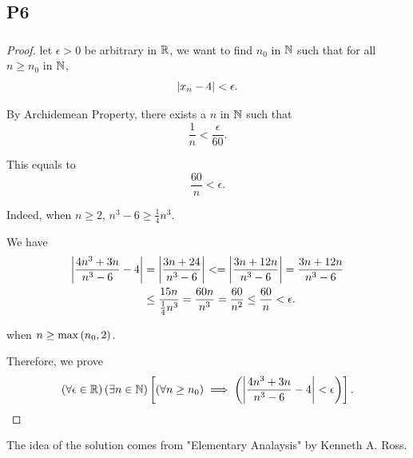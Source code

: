 
\subsection{P6}

\subsubsection{}
\begin{proof}
    let $\epsilon > 0$ be arbitrary in $\mathbb{R}$, we want to find $n_0 $ in $\mathbb{N}$ such that for all $n \geq n_0$ in $\mathbb{N}$, 
    \begin{equation*}
        \left|x_n - 4\right| < \epsilon. 
    \end{equation*} 

    By Archidemean Property, there exists a $n$ in $\mathbb{N}$ such that 
    \begin{equation*}
        \frac{1}{n} < \frac{\epsilon}{60}. 
    \end{equation*}

    This equals to 
    \begin{equation*}
        \frac{60}{n} < \epsilon. 
    \end{equation*}

    Indeed, when $n \geq 2$, $n^3 - 6 \geq \frac{1}{4}n^3$. 

    We have 
    \begin{align*}
        \left|\frac{4n^3 + 3n}{n^3 - 6} - 4\right| &= \left|\frac{
            3n + 24
        }{
            n^3 - 6
        }\right| <= 
        \left|
            \frac{
                3n + 12n
            }{n^3 - 6}
        \right| 
        =
        \frac{
            3n + 12n
        }{n^3 - 6} \\
        & \leq \frac{
            15n
        }{
            \frac{1}{4}n^3
        } = 
        \frac{60n}{
            n^3
        } = \frac{60}{n^2} \leq 
        \frac{
            60
        }{n
        } < \epsilon. 
    \end{align*}

    when $n \geq \max \left(n_0, 2\right)$. 

    Therefore, we prove 
    \begin{equation*}
        \left(\forall \epsilon \in \mathbb{R} \right)\left(\exists n \in \mathbb{N} \right) \left[\left(\forall n \geq n_0\right) \implies \left(\left|\frac{
            4n^3 + 3n
        }{
            n^3 - 6
        } - 4\right| < \epsilon\right)\right]. 
    \end{equation*}
\end{proof}
\begin{remark}
    The idea of the solution comes from "Elementary Analaysis" by Kenneth A. Ross. 
\end{remark}

